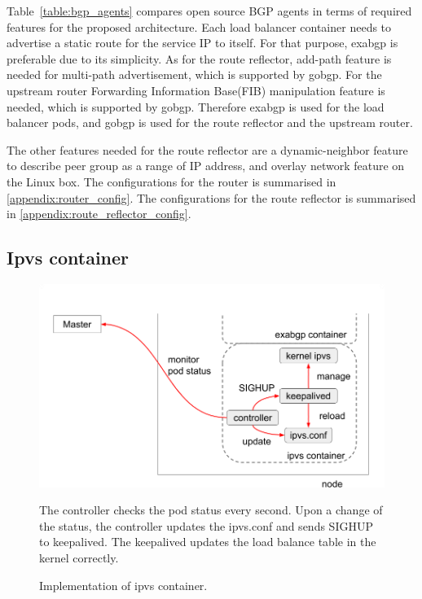 Table~\ref{table:bgp_agents} compares open source BGP agents in terms of required features for the proposed architecture.
Each load balancer container needs to advertise a static route for the service IP to itself. 
For that purpose, exabgp is preferable due to its simplicity.
As for the route reflector, add-path\cite{rfc7911} feature is needed for multi-path advertisement, which is supported by gobgp.
For the upstream router Forwarding Information Base(FIB) manipulation\cite{exa-networks_2018} feature is needed, which is supported by gobgp.
Therefore exabgp is used for the load balancer pods, and gobgp is used for the route reflector and the upstream router.

The other features needed for the route reflector are a dynamic-neighbor feature to describe peer group as a range of IP address, and overlay network feature on the Linux box.
The configurations for the router is summarised in \ref{appendix:router_config}.
The configurations for the route reflector is summarised in \ref{appendix:route_reflector_config}.

\subsection{Ipvs container}\label{sec:ipvs}

\begin{figure}[h]
  \begin{center}
    \includegraphics[width=0.8\columnwidth]{Figs/ipvs-ingress-schem}
    \caption{Implementation of ipvs container.}

    \parbox[c]{0.9\columnwidth}{
      The controller checks the pod status every second.
      Upon a change of the status, the controller updates the ipvs.conf and sends SIGHUP to keepalived.
      The keepalived updates the load balance table in the kernel correctly.
    }
  \end{center}

  \label{fig:IPVS-ingress-schem}
\end{figure}

